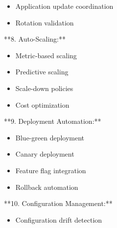 \documentclass[11pt,a4paper]{article}
\begin{document}
\begin{itemize}
\item Application update coordination
\end{itemize}

\begin{itemize}
\item Rotation validation
\end{itemize}

**8. Auto-Scaling:**

\begin{itemize}
\item Metric-based scaling
\end{itemize}

\begin{itemize}
\item Predictive scaling
\end{itemize}

\begin{itemize}
\item Scale-down policies
\end{itemize}

\begin{itemize}
\item Cost optimization
\end{itemize}

**9. Deployment Automation:**

\begin{itemize}
\item Blue-green deployment
\end{itemize}

\begin{itemize}
\item Canary deployment
\end{itemize}

\begin{itemize}
\item Feature flag integration
\end{itemize}

\begin{itemize}
\item Rollback automation
\end{itemize}

**10. Configuration Management:**

\begin{itemize}
\item Configuration drift detection
\end{itemize}
\end{document}
